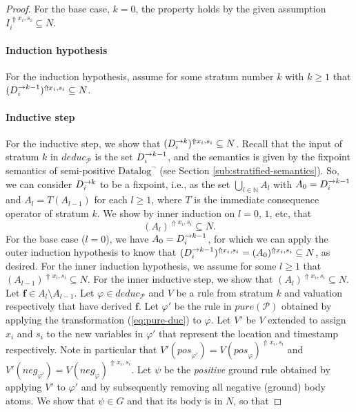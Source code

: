 \documentclass{tlp}
\newcommand{\langname}[1]{\text{#1}}  \newcommand{\pred}[1]{\mathtt{#1}}  \newcommand{\fname}[1]{\mathit{#1}}  \newcommand{\sq}[1]{`{#1}'}
\newcommand{\datalogneg}{\langname{Datalog}^{\neg}}
\newcommand{\Nat}{\mathbb{N}}  \newcommand{\len}[1]{|#1|} \newcommand{\rom}[1]{\text{\emph{(#1)}}} \newcommand{\romI}{\rom i}
\newcommand{\ded}{\mathcal{P}}
\newcommand{\fc}{\boldsymbol{f}}
\newcommand{\rl}{\varphi}
\newcommand{\bpos}[1]{\fname{pos}_{#1}}
\newcommand{\bneg}[1]{\fname{neg}_{#1}}
\newcommand{\grl}{\psi}
\newcommand{\sh}[1]{(#1)}
\newcommand{\addlt}[3]{#1^{\Uparrow#2,#3}}
\newcommand{\shaddlt}[3]{\addlt{\sh{#1}}{#2}{#3}}
\newcommand{\pure}[1]{\fname{pure}(#1)}
\newcommand{\deduc}[1]{\fname{deduc}_{#1}}
\newcommand{\grded}{G}
\begin{document}
\begin{appendix}
\begin{proof}
For the base case, $k=0$, the property holds by the given assumption
$\addlt{I_{i}}{x_{i}}{s_{i}}\subseteq N$. 


\paragraph*{Induction hypothesis}

For the induction hypothesis, assume for some stratum number $k$
with $k\geq1$ that $\shaddlt{\strat{D_{i}}{k-1}}{x_{i}}{s_{i}}\subseteq N$. 


\paragraph*{Inductive step}

For the inductive step, we show that $\shaddlt{\strat{D_{i}}k}{x_{i}}{s_{i}}\subseteq N$.
Recall that the input of stratum $k$ in $\deduc{\ded}$ is the set
$D_{i}^{\to k-1}$, and the semantics is given by the fixpoint
semantics of semi-positive $\datalogneg$ (see Section \ref{sub:stratified-semantics}).
So, we can consider $D_{i}^{\to k}$ to be a fixpoint, i.e., as the
set $\bigcup_{l\in\Nat}A_{l}$ with $A_{0}=D_{i}^{\to k-1}$ and
$A_{l}=T(A_{l-1})$ for each $l\geq1$, where $T$ is the immediate
consequence operator of stratum $k$. We show by inner induction on
$l=0$, $1$, etc, that 
\[
\shaddlt{A_{l}}{x_{i}}{s_{i}}\subseteq N.
\]
For the base case ($l=0$), we have $A_{0}=D_{i}^{\to k-1}$, for
which we can apply the outer induction hypothesis to know that $\shaddlt{\strat{D_{i}}{k-1}}{x_{i}}{s_{i}}=\shaddlt{A_{0}}{x_{i}}{s_{i}}\subseteq N$,
as desired. For the inner induction hypothesis, we assume for some
$l\geq1$ that $\shaddlt{A_{l-1}}{x_{i}}{s_{i}}\subseteq N$. For
the inner inductive step, we show that $\shaddlt{A_{l}}{x_{i}}{s_{i}}\subseteq N$.
Let $\fc\in A_{l}\setminus A_{l-1}$. Let $\rl\in\deduc{\ded}$ and
$V$ be a rule from stratum $k$ and valuation respectively that have
derived $\fc$. Let $\rl'$ be the rule in $\pure{\ded}$ obtained
by applying the transformation (\ref{eq:pure-duc}) to $\rl$. Let
$V'$ be $V$ extended to assign $x_{i}$ and $s_{i}$ to the new
variables in $\rl'$ that represent the location and timestamp respectively.
Note in particular that $V'(\bpos{\rl'})=\addlt{V(\bpos{\rl})}{x_{i}}{s_{i}}$
and $V'(\bneg{\rl'})=\addlt{V(\bneg{\rl})}{x_{i}}{s_{i}}$. Let $\grl$
be the \emph{positive} ground rule obtained by applying $V'$ to
$\rl'$ and by subsequently removing all negative (ground) body atoms.
We show that $\grl\in\grded$ and that its body is in $N$, so that

\end{proof}
\end{appendix}
\end{document}
